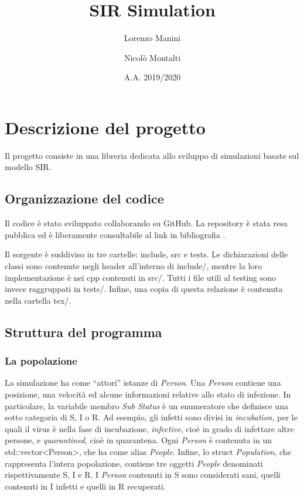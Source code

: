 \documentclass[a4paper,10pt,twocolumn]{article}
\begin{document}
\title{SIR Simulation}
\author{Lorenzo Manini \and Nicolò Montalti}
\date{A.A. 2019/2020}

\maketitle

\section{Descrizione del progetto}
Il progetto consiste in una libreria dedicata allo sviluppo di simulazioni basate sul modello SIR. 

\subsection*{Organizzazione del codice}
Il codice è stato sviluppato collaborando su GitHub. La repository è stata resa pubblica ed è liberamente consultabile al link in bibliografia \cite{bib:GitHub}.

Il sorgente è suddiviso in tre cartelle: include, src e tests. Le dichiarazioni delle classi sono contenute negli header all'interno di include/, mentre la loro implementazione è nei cpp contenuti in src/. Tutti i file utili al testing sono invece raggruppati in tests/. Infine, una copia di questa relazione è contenuta nella cartella tex/.

\subsection*{Struttura del programma}
\subsubsection*{La popolazione}
La simulazione ha come “attori” istanze di \emph{Person}. Una \emph{Person} contiene una posizione, una velocità ed alcune informazioni relative allo stato di infezione. In particolare, la variabile membro \emph{Sub Status} è un enumeratore che definisce una sotto categoria di S, I o R. Ad esempio, gli infetti sono divisi in \emph{incubation}, per le quali il virus è nella fase di incubazione, \emph{infective}, cioè in grado di infettare altre persone, e \emph{quarantined}, cioè in quarantena. Ogni \emph{Person} è contenuta in un std::vector<Person>, che ha come alias \emph{People}. Infine, lo struct \emph{Population}, che rappresenta l’intera popolazione, contiene tre oggetti \emph{People} denominati rispettivamente S, I e R. I \emph{Person} contenuti in S sono considerati sani, quelli contenuti in I infetti e quelli in R recuperati.
\end{document}
